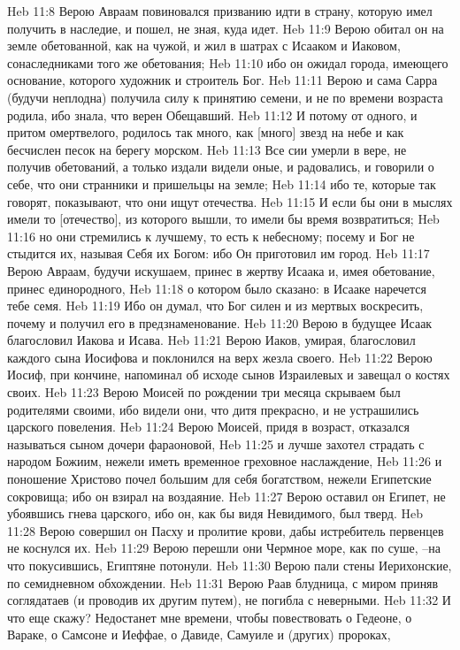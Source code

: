 Heb 11:8  Верою Авраам повиновался призванию идти в страну, которую имел получить в наследие, и пошел, не зная, куда идет.
Heb 11:9  Верою обитал он на земле обетованной, как на чужой, и жил в шатрах с Исааком и Иаковом, сонаследниками того же обетования;
Heb 11:10  ибо он ожидал города, имеющего основание, которого художник и строитель Бог.
Heb 11:11  Верою и сама Сарра (будучи неплодна) получила силу к принятию семени, и не по времени возраста родила, ибо знала, что верен Обещавший.
Heb 11:12  И потому от одного, и притом омертвелого, родилось так много, как [много] звезд на небе и как бесчислен песок на берегу морском.
Heb 11:13  Все сии умерли в вере, не получив обетований, а только издали видели оные, и радовались, и говорили о себе, что они странники и пришельцы на земле;
Heb 11:14  ибо те, которые так говорят, показывают, что они ищут отечества.
Heb 11:15  И если бы они в мыслях имели то [отечество], из которого вышли, то имели бы время возвратиться;
Heb 11:16  но они стремились к лучшему, то есть к небесному; посему и Бог не стыдится их, называя Себя их Богом: ибо Он приготовил им город.
Heb 11:17  Верою Авраам, будучи искушаем, принес в жертву Исаака и, имея обетование, принес единородного,
Heb 11:18  о котором было сказано: в Исааке наречется тебе семя.
Heb 11:19  Ибо он думал, что Бог силен и из мертвых воскресить, почему и получил его в предзнаменование.
Heb 11:20  Верою в будущее Исаак благословил Иакова и Исава.
Heb 11:21  Верою Иаков, умирая, благословил каждого сына Иосифова и поклонился на верх жезла своего.
Heb 11:22  Верою Иосиф, при кончине, напоминал об исходе сынов Израилевых и завещал о костях своих.
Heb 11:23  Верою Моисей по рождении три месяца скрываем был родителями своими, ибо видели они, что дитя прекрасно, и не устрашились царского повеления.
Heb 11:24  Верою Моисей, придя в возраст, отказался называться сыном дочери фараоновой,
Heb 11:25  и лучше захотел страдать с народом Божиим, нежели иметь временное греховное наслаждение,
Heb 11:26  и поношение Христово почел большим для себя богатством, нежели Египетские сокровища; ибо он взирал на воздаяние.
Heb 11:27  Верою оставил он Египет, не убоявшись гнева царского, ибо он, как бы видя Невидимого, был тверд.
Heb 11:28  Верою совершил он Пасху и пролитие крови, дабы истребитель первенцев не коснулся их.
Heb 11:29  Верою перешли они Чермное море, как по суше, --на что покусившись, Египтяне потонули.
Heb 11:30  Верою пали стены Иерихонские, по семидневном обхождении.
Heb 11:31  Верою Раав блудница, с миром приняв соглядатаев (и проводив их другим путем), не погибла с неверными.
Heb 11:32  И что еще скажу? Недостанет мне времени, чтобы повествовать о Гедеоне, о Вараке, о Самсоне и Иеффае, о Давиде, Самуиле и (других) пророках,

